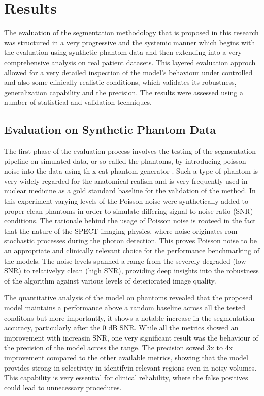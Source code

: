 \chapter{Results}
\label{ch:results}

The evaluation of the segmentation methodology that is proposed in this research was structured in a very progressive and the systemic manner which begins with the evaluation using synthetic phantom data and then extending into a very comprehensive analysis on real patient datasets. This layered evaluation approch allowed for a very detailed inspection of the model's behaviour under controlled and also some clinically realistic conditions, which validates its robustness, generalization capability and the precision. The results were  assessed using a number of statistical and validation techniques.

\section{Evaluation on Synthetic Phantom Data}
The first phase of the evaluation process involves the testing of the segmentation pipeline on simulated data, or so-called the phantoms, by introducing poisson noise into the data using th x-cat phantom generator \cite{xcat}. Such a type of phantom is very widely regarded for the anatomical realism and is very frequently used in nuclear medicine as a gold standard baseline for the validation of the method. In this experiment varying levels of the Poisson noise were synthetically added to proper clean phantoms in order to simulate differing signal-to-noise ratio (SNR) conditions. The rationale behind the usage of Poisson noise is rooteed in the fact that the nature of the SPECT imaging physics, where noise originates rom stochastic processes during the photon detection. This proves Poisson noise to be an appropriate and clinically relevant choice for the performance benchmarking of the models. The noise levels spanned a range from the severely degraded (low SNR) to relativelyy clean (high SNR), providing deep insights into the robustness of the algorithm against various levels of deteriorated image quality.

The quantitative analysis of the model on phantoms revealed that the proposed model maintains a performance above a random baseline across all the tested conditons but more importantly, it shows a notable increase in the segmentation accuracy, particularly after the 0 dB SNR. While all the metrics showed an improvement with increasin SNR, one very significant result was the behaviour of the precision of the model across the range. The precision sowed 3x to 4x improvement compared to the other available metrics, showing that the model provides strong in selectivity in identifyin relevant regions even in noisy volumes. This capability is very essential for clinical reliability, where the false positives could lead to unnecessary procedures.

